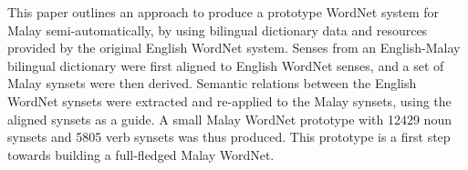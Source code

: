 \documentclass[10pt]{article}
\begin{document}
%
\begin{preview}
This paper outlines an approach to produce a prototype WordNet system for Malay semi-automatically, by using bilingual dictionary data and resources provided by the original English WordNet system. Senses from an English-Malay bilingual dictionary were first aligned to English WordNet senses, and a set of Malay synsets were then derived. Semantic relations between the English WordNet synsets were extracted and re-applied to the Malay synsets, using the aligned synsets as a guide. A small Malay WordNet prototype with 12429 noun synsets and 5805 verb synsets was thus produced. This prototype is a first step towards building a full-fledged Malay WordNet.
\end{preview}
\end{document}
